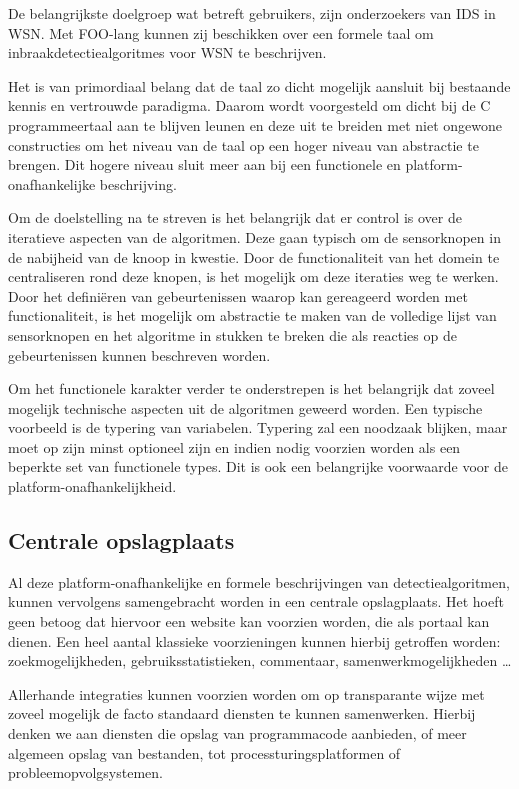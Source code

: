 De belangrijkste doelgroep wat betreft gebruikers, zijn onderzoekers van IDS in
WSN. Met FOO-lang kunnen zij beschikken over een formele taal om
inbraakdetectiealgoritmes voor WSN te beschrijven.

Het is van primordiaal belang dat de taal zo dicht mogelijk aansluit bij
bestaande kennis en vertrouwde paradigma. Daarom wordt voorgesteld om dicht bij
de C programmeertaal aan te blijven leunen en deze uit te breiden met niet
ongewone constructies om het niveau van de taal op een hoger niveau van
abstractie te brengen. Dit hogere niveau sluit meer aan bij een functionele en
platform-onafhankelijke beschrijving.

Om de doelstelling na te streven is het belangrijk dat er control is over de
iteratieve aspecten van de algoritmen. Deze gaan typisch om de sensorknopen in
de nabijheid van de knoop in kwestie. Door de functionaliteit van het domein te
centraliseren rond deze knopen, is het mogelijk om deze iteraties weg te
werken. Door het defini\"eren van gebeurtenissen waarop kan gereageerd worden
met functionaliteit, is het mogelijk om abstractie te maken van de volledige
lijst van sensorknopen en het algoritme in stukken te breken die als reacties
op de gebeurtenissen kunnen beschreven worden.

Om het functionele karakter verder te onderstrepen is het belangrijk dat zoveel
mogelijk technische aspecten uit de algoritmen geweerd worden. Een typische
voorbeeld is de typering van variabelen. Typering zal een noodzaak blijken,
maar moet op zijn minst optioneel zijn en indien nodig voorzien worden als een
beperkte set van functionele types. Dit is ook een belangrijke voorwaarde voor
de platform-onafhankelijkheid.

\subsection{Centrale opslagplaats}
\label{subsection:arch-repository}

Al deze platform-onafhankelijke en formele beschrijvingen van
detectiealgoritmen, kunnen vervolgens samengebracht worden in een centrale
opslagplaats. Het hoeft geen betoog dat hiervoor een website kan voorzien
worden, die als portaal kan dienen. Een heel aantal klassieke voorzieningen
kunnen hierbij getroffen worden: zoekmogelijkheden, gebruiksstatistieken,
commentaar, samenwerkmogelijkheden \dots

Allerhande integraties kunnen voorzien worden om op transparante wijze met
zoveel mogelijk de facto standaard diensten te kunnen samenwerken. Hierbij
denken we aan diensten die opslag van programmacode aanbieden, of meer algemeen
opslag van bestanden, tot processturingsplatformen of probleemopvolgsystemen.

